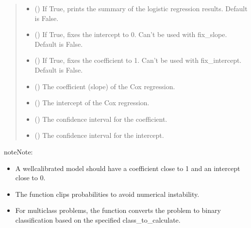 \documentclass[letterpaper,10pt,english]{sphinxmanual}
\begin{document}
\begin{fulllineitems}
\begin{quote}
\begin{description}
\begin{itemize}
\item {} 
\sphinxAtStartPar
{} () \textendash{} If True, prints the summary of the logistic regression results. Default is False.

\item {} 
\sphinxAtStartPar
{} () \textendash{} If True, fixes the intercept to 0. Can’t be used with fix\_slope. Default is False.

\item {} 
\sphinxAtStartPar
{} () \textendash{} If True, fixes the coefficient to 1. Can’t be used with fix\_intercept. Default is False.

\end{itemize}

\begin{itemize}
\item {} 
\sphinxAtStartPar
{} () \textendash{} The coefficient (slope) of the Cox regression.

\item {} 
\sphinxAtStartPar
{} () \textendash{} The intercept of the Cox regression.

\item {} 
\sphinxAtStartPar
{} () \textendash{} The confidence interval for the coefficient.

\item {} 
\sphinxAtStartPar
{} () \textendash{} The confidence interval for the intercept.

\end{itemize}

\end{description}\end{quote}

\begin{sphinxadmonition}{note}{Note:}\begin{itemize}
\item {} 
\sphinxAtStartPar
A well\sphinxhyphen{}calibrated model should have a coefficient close to 1 and an intercept close to 0.

\item {} 
\sphinxAtStartPar
The function clips probabilities to avoid numerical instability.

\item {} 
\sphinxAtStartPar
For multi\sphinxhyphen{}class problems, the function converts the problem to binary classification
based on the specified class\_to\_calculate.

\end{itemize}
\end{sphinxadmonition}

\end{fulllineitems}
\end{document}
